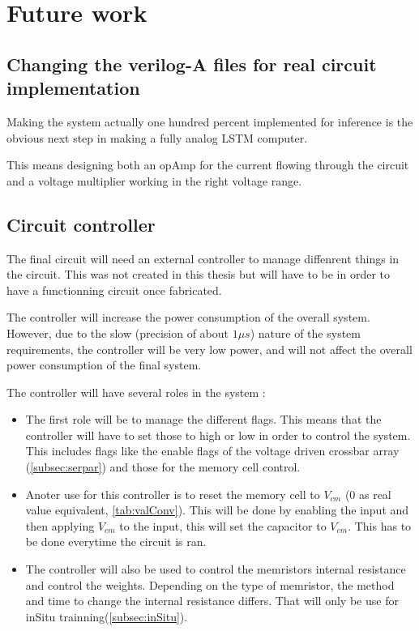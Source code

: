 \section{Future work}\label{sec:further}

\subsection{Changing the verilog-A files for real circuit implementation}

Making the system actually one hundred percent implemented for inference is the obvious next step in making a fully analog \ac{LSTM} computer.

This means designing both an \ac{opAmp} for the current flowing through the circuit and a voltage multiplier working in the right voltage range.

\subsection{Circuit controller}\label{subsec:control}

The final circuit will need an external controller to manage diffenrent things in the circuit. This was not created in this thesis but will have to be in order to have a functionning circuit once fabricated.

The controller will increase the power consumption of the overall system. However, due to the slow (precision of about $1\mu s$) nature of the system requirements, the controller will be very low power, and will not affect the overall power consumption of the final system.

The controller will have several roles in the system :
\begin{itemize}
  \item The first role will be to manage the different flags. This means that the controller will have to set those to high or low in order to control the system. This includes flags like the enable flags of the voltage driven crossbar array (\cref{subsec:serpar}) and those for the memory cell control.
  \item Anoter use for this controller is to reset the memory cell to $V_{cm}$ ($0$ as real value equivalent, \cref{tab:valConv}). This will be done by enabling the input and then applying $V_{cm}$ to the input, this will set the capacitor to $V_{cm}$. This has to be done everytime the circuit is ran.
  \item The controller will also be used to control the memristors internal resistance and control the weights. Depending on the type of memristor, the method and time to change the internal resistance differs. That will only be use for inSitu trainning(\cref{subsec:inSitu}).
\end{itemize}

